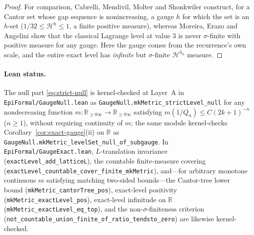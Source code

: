\documentclass[11pt]{article}
\theoremstyle{definition}
\theoremstyle{remark}
\newcommand{\R}{\mathbb{R}}
\begin{document}
\begin{proof}
For comparison, Cabrelli, Mendivil, Molter and Shonkwiler
\cite[\S5, Theorem~3]{CMMS} construct, for a Cantor set whose gap
sequence is nonincreasing, a gauge $h$ for which the set is an $h$-set
($1/32\le\mathcal H^h\le1$, a finite positive measure), whereas Moreira, Erazo
and Angelini \cite{MEA} show that the classical Lagrange level at value $3$ is
never $\sigma$-finite with positive measure for any gauge. Here the gauge comes
from the recurrence's own scale, and the entire exact level has \emph{infinite}
but $\sigma$-finite $\mathcal H^{h_k}$ measure.
\end{proof}

\paragraph{Lean status.}
The null part \eqref{eq:strict-null} is kernel-checked at Layer~A in
\texttt{EpiFormal/\allowbreak GaugeNull.lean} as
\texttt{GaugeNull.\allowbreak mkMetric\_\allowbreak strictLevel\_\allowbreak null}
for any nondecreasing function $m:\R_{\ge0\infty}\to\R_{\ge0\infty}$ satisfying
$m(1/Q_n)\le C(2k+1)^{-n}$ ($n\ge1$), without requiring continuity of $m$; the
same module kernel-checks Corollary~\ref{cor:exact-gauge}(ii) on $\R$ as
\texttt{GaugeNull.\allowbreak mkMetric\_\allowbreak levelSet\_\allowbreak null\_\allowbreak of\_\allowbreak subgauge}.
In \texttt{EpiFormal/\allowbreak GaugeExact.lean}, $L$-translation invariance
(\texttt{exactLevel\_\allowbreak add\_\allowbreak latticeL}), the countable
finite-measure covering
(\texttt{exactLevel\_\allowbreak countable\_\allowbreak cover\_\allowbreak finite\_\allowbreak mkMetric}),
and---for arbitrary monotone continuous $m$ satisfying matching two-sided
bounds---the Cantor-tree lower bound
(\texttt{mkMetric\_\allowbreak cantorTree\_\allowbreak pos}), exact-level
positivity (\texttt{mkMetric\_\allowbreak exactLevel\_\allowbreak pos}),
exact-level infinitude on $\R$
(\texttt{mkMetric\_\allowbreak exactLevel\_\allowbreak eq\_\allowbreak top}),
and the non-$\sigma$-finiteness criterion
(\texttt{not\_\allowbreak countable\_\allowbreak union\_\allowbreak finite\_\allowbreak of\_\allowbreak ratio\_\allowbreak tendsto\_\allowbreak zero})
are likewise kernel-checked.
\end{document}

